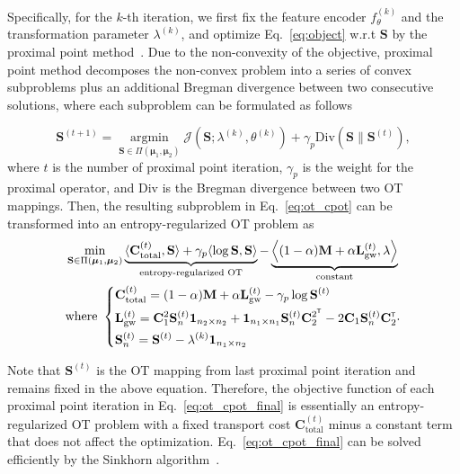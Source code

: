 Specifically, for the $k$-th iteration, we first fix the feature encoder $f_\theta^{(k)}$ and the transformation parameter $\lambda^{(k)}$, and optimize Eq.~\eqref{eq:object} w.r.t $\mathbf{S}$ by the proximal point method~\cite{s-gwl}. 
Due to the non-convexity of the objective, proximal point method decomposes the non-convex problem into a series of convex subproblems plus an additional Bregman divergence between two consecutive solutions, where each subproblem can be formulated as follows

\vspace{-10pt}
\begin{equation}
    \mathbf{S}^{(t+1)} = \mathop{\arg\min}\limits_{\mathbf{S}\in\Pi(\bm{\mu}_1, \bm{\mu}_2)} \mathcal{J}(\mathbf{S};\lambda^{(k)}, \theta^{(k)}) + \gamma_p \text{Div}(\mathbf{S}\|\mathbf{S}^{(t)}),
\label{eq:ot_cpot}
\end{equation}
\noindent where $t$ is the number of proximal point iteration, $\gamma_p$ is the weight for the proximal operator, and $\text{Div}$ is the Bregman divergence between two OT mappings. Then, the resulting subproblem in Eq.~\eqref{eq:ot_cpot} can be transformed into an entropy-regularized OT problem as
\begin{equation}
\begin{aligned}
&\min_{\mathbf{S}\in\Pi(\boldsymbol{\mu}_1,\boldsymbol{\mu}_2)}\underbrace{\langle \mathbf{C}_{\text{total}}^{(t)}, \mathbf{S}\rangle + \gamma_p\langle\log\mathbf{S}, \mathbf{S}\rangle}_{\text{entropy-regularized OT}} - \underbrace{\left<(1-\alpha)\mathbf{M}+\alpha\mathbf{L}^{(t)}_{\text{gw}}, \lambda\right>}_{\text{constant}}\\
&\text{where }\left\{
\begin{aligned}
    &\mathbf{C}_{\text{total}}^{(t)}=(1-\alpha)\mathbf{M}+ \alpha\mathbf{L}^{(t)}_{\text{gw}}-\gamma_p\log\mathbf{S}^{(t)}\\
    &\mathbf{L}_{\text{gw}}^{(t)}=\mathbf{C}_1^2\mathbf{S}_n^{(t)}\mathbf{1}_{n_2\times n_2} +\mathbf{1}_{n_1\times n_1}\mathbf{S}_n^{(t)}\mathbf{C}_2^{2^{\scriptscriptstyle\mathsf{T}}} -2\mathbf{C}_1\mathbf{S}_n^{(t)}\mathbf{C}_2^{\scriptscriptstyle\mathsf{T}}\\
    &\mathbf{S}_n^{(t)}=\mathbf{S}^{(t)}-\lambda^{(k)}\mathbf{1}_{n_1\times n_2}
\end{aligned}.
\right.
\end{aligned}
\label{eq:ot_cpot_final}
\end{equation}

Note that $\mathbf{S}^{(t)}$ is the OT mapping from last proximal point iteration and remains fixed in the above equation. Therefore, the objective function of each proximal point iteration in Eq.~\eqref{eq:ot_cpot_final} is essentially an entropy-regularized OT problem with a fixed transport cost $\mathbf{C}_{\text{total}}^{(t)}$ minus a constant term that does not affect the optimization. Eq.~\eqref{eq:ot_cpot_final} can be solved efficiently by the Sinkhorn algorithm~\cite{peyre2019computational}.

